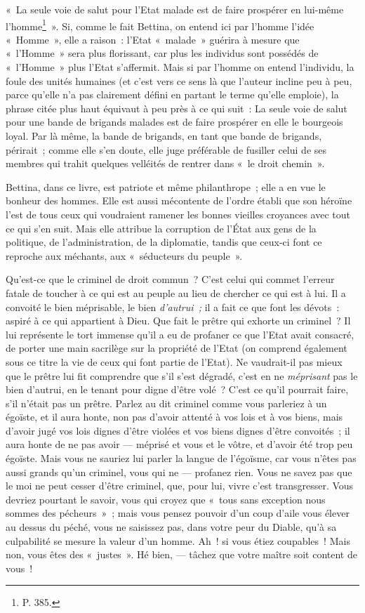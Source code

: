 \documentclass[french,twoside]{book} %
\begin{document}
« La seule voie de salut pour l’Etat malade est de faire prospérer en lui-même l’homme\footnote{ \noindent P. 385.
 } ». Si, comme le fait Bettina, on entend ici par l’homme l’idée « Homme », elle a raison : l’Etat « malade » guérira à mesure que « l’Homme » sera plus florissant, car plus les individus sont possédés de « l’Homme » plus l’Etat s’affermit. Mais si par l’homme on entend l’individu, la foule des unités humaines (et c’est vers ce  sens là que l’auteur incline peu à peu, parce qu’elle n’a pas clairement défini en partant le terme qu’elle emploie), la phrase citée plus haut équivaut à peu près à ce qui suit : La seule voie de salut pour une bande de brigands malades est de faire prospérer en elle le bourgeois loyal. Par là même, la bande de brigands, en tant que bande de brigands, périrait ; comme elle s’en doute, elle juge préférable de fusiller celui de ses membres qui trahit quelques velléités de rentrer dans « le droit chemin ».\par
Bettina, dans ce livre, est patriote et même philanthrope ; elle a en vue le bonheur des hommes. Elle est aussi mécontente de l’ordre établi que son héroïne l’est de tous ceux qui voudraient ramener les bonnes vieilles croyances avec tout ce qui s’en suit. Mais elle attribue la corruption de l’État aux gens de la politique, de l’administration, de la diplomatie, tandis que ceux-ci font ce reproche aux méchants, aux « séducteurs du peuple ».\par
Qu’est-ce que le criminel de droit commun ? C’est celui qui commet l’erreur fatale de toucher à ce qui est au peuple au lieu de chercher ce qui est à lui. Il a convoité le bien méprisable, le bien \emph{d’autrui ;} il a fait ce que font les dévots : aspiré à ce qui appartient à Dieu. Que fait le prêtre qui exhorte un criminel ? Il lui représente le tort immense qu’il a eu de profaner ce que l’Etat avait consacré, de porter une main sacrilège sur la propriété de l’Etat (on comprend également sous ce titre la vie de ceux qui font partie de l’Etat). Ne vaudrait-il pas mieux que le prêtre lui fit comprendre que s’il s’est dégradé, c’est en ne \emph{méprisant} pas le bien d’autrui, en le tenant pour digne d’être volé ? C’est ce qu’il pourrait faire, s’il n’était pas un prêtre. Parlez au dit criminel comme vous parleriez à un égoïste, et il aura honte, non pas d’avoir attenté à vos lois et à vos biens, mais d’avoir jugé vos lois dignes d’être violées et vos biens dignes d’être convoités ; il aura honte de  ne pas avoir — méprisé et vous et le vôtre, et d’avoir été trop peu égoïste. Mais vous ne sauriez lui parler la langue de l’égoïsme, car vous n’êtes pas aussi grands qu’un criminel, vous qui ne — profanez rien. Vous ne savez pas que le moi ne peut cesser d’être criminel, que, pour lui, vivre c’est transgresser. Vous devriez pourtant le savoir, vous qui croyez que « tous sans exception nous sommes des pécheurs » ; mais vous pensez pouvoir d’un coup d’aile vous élever au dessus du péché, vous ne saisissez pas, dans votre peur du Diable, qu’à sa culpabilité se mesure la valeur d’un homme. Ah ! si vous étiez coupables ! Mais non, vous êtes des « justes ». Hé bien, — tâchez que votre maître soit content de vous !\par
\end{document}
